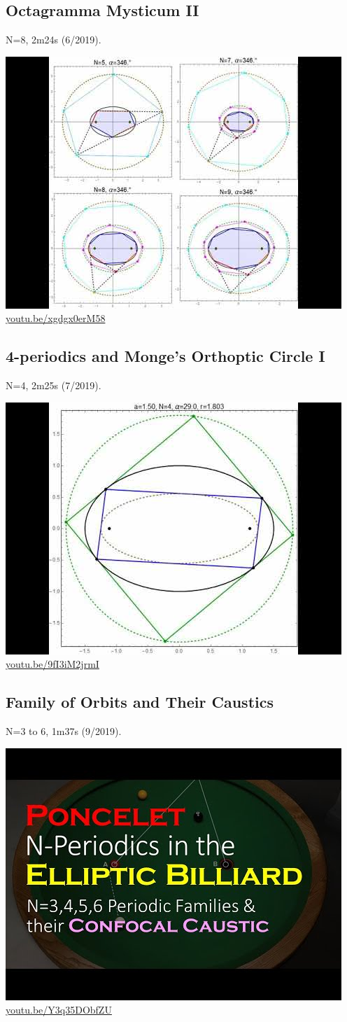 \documentclass[12pt]{amsart}
\begin{document}
\subsection{Octagramma Mysticum II}
\label{vid:xgdgx0erM58}
\noindent N=8, 2m24s (6/2019). 
\begin{center}\includegraphics[width=.5\textwidth]{pics/xgdgx0erM58.jpg} \\ 
\href{https://youtu.be/xgdgx0erM58}{\url{youtu.be/xgdgx0erM58}}\end{center}
% 

\subsection{4-periodics and Monge's Orthoptic Circle I}
\label{vid:9fI3iM2jrmI}
\noindent N=4, 2m25s (7/2019). 
\begin{center}\includegraphics[width=.5\textwidth]{pics/9fI3iM2jrmI.jpg} \\ 
\href{https://youtu.be/9fI3iM2jrmI}{\url{youtu.be/9fI3iM2jrmI}}\end{center}
% 

\subsection{Family of Orbits and Their Caustics}
\label{vid:Y3q35DObfZU}
\noindent N=3 to 6, 1m37s (9/2019). 
\begin{center}\includegraphics[width=.5\textwidth]{pics/Y3q35DObfZU.jpg} \\ 
\href{https://youtu.be/Y3q35DObfZU}{\url{youtu.be/Y3q35DObfZU}}\end{center}
% 
\end{document}
